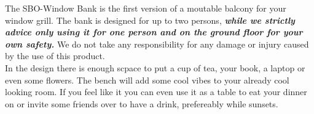 \documentclass{subfiles}
\begin{document}
    The SBO-Window Bank is the first version of a moutable balcony for your window grill.
    The bank is designed for up to two persons, \emph{\textbf{while we strictly advice only using it for one person and on the ground floor for your own safety.}} We do not take any responsibility for any damage or injury caused by the use of this product. \\

    In the design there is enough scpace to put a cup of tea, your book, a laptop or even some flowers.
    The bench will add some cool vibes to your already cool looking room. If you feel like it you can even use it as a table to eat your dinner on or invite some friends over to have a drink, prefereably while sunsets.
\end{document}
